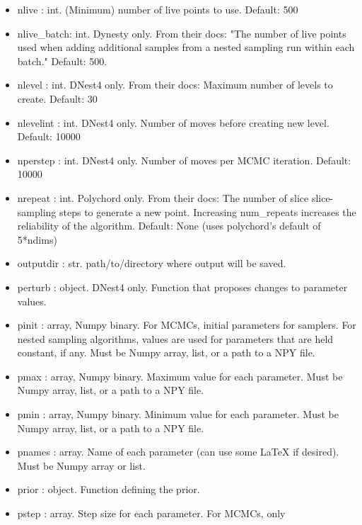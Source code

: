 \documentclass[letterpaper, 12pt]{article}
\begin{document}
\begin{itemize}
\item nlive : int. (Minimum) number of live points to use. Default: 500
\item nlive\_batch: int. Dynesty only. From their docs: "The number of  
                         live points used when adding additional  
                         samples from a nested sampling run within  
                         each batch."  Default: 500.
\item nlevel : int. DNest4 only. From their docs: Maximum number of levels to 
                    create.  Default: 30
\item nlevelint : int. DNest4 only. Number of moves before creating new level. 
                       Default: 10000
\item nperstep : int. DNest4 only. Number of moves per MCMC iteration.  
                      Default: 10000
\item nrepeat : int. Polychord only.  From their docs: The number of 
                     slice slice-sampling steps to generate a new 
                     point.  Increasing num_repeats increases the 
                     reliability of the algorithm.  Default: None 
                     (uses polychord's default of 5*ndims)
\item outputdir : str. path/to/directory where output will be saved.
\item perturb : object. DNest4 only. Function that proposes changes to 
                        parameter values.
\item pinit : array, Numpy binary. For MCMCs, initial parameters for  
                            samplers.  For nested sampling algorithms,  
                            values are used for parameters that are held  
                            constant, if any. 
                        Must be Numpy array, list, or a path to a NPY file.
\item pmax : array, Numpy binary. Maximum value for each parameter. 
                        Must be Numpy array, list, or a path to a NPY file.
\item pmin : array, Numpy binary. Minimum value for each parameter. 
                        Must be Numpy array, list, or a path to a NPY file.
\item pnames : array. Name of each parameter (can use some LaTeX if  
                          desired). 
                          Must be Numpy array or list.
\item prior : object. Function defining the prior.
\item pstep : array. Step size for each parameter.  For MCMCs, only  

\end{itemize}
\end{document}
